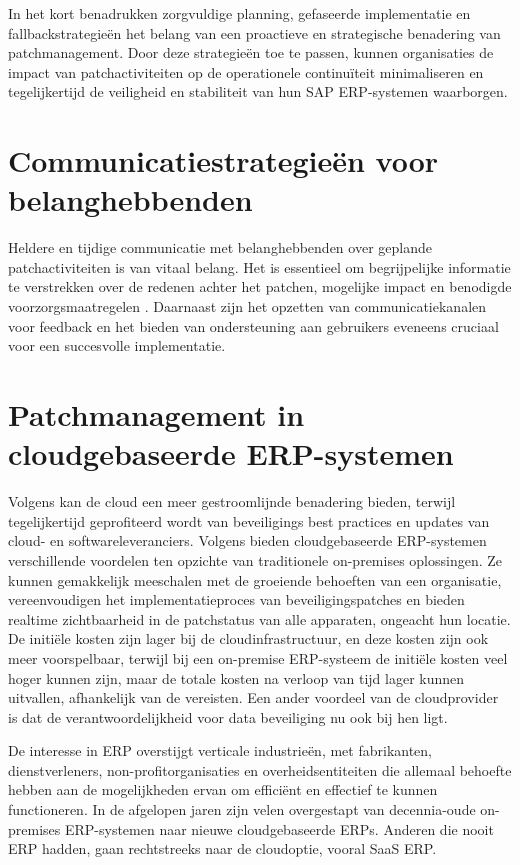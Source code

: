 In het kort benadrukken zorgvuldige planning, gefaseerde implementatie en fallbackstrategieën het belang van een proactieve en strategische benadering van patchmanagement. Door deze strategieën toe te passen, kunnen organisaties de impact van patchactiviteiten op de operationele continuïteit minimaliseren en tegelijkertijd de veiligheid en stabiliteit van hun SAP ERP-systemen waarborgen.

\section{Communicatiestrategieën voor belanghebbenden}
Heldere en tijdige communicatie met belanghebbenden over geplande patchactiviteiten is van vitaal belang. Het is essentieel om begrijpelijke informatie te verstrekken over de redenen achter het patchen, mogelijke impact en benodigde voorzorgsmaatregelen \autocite{Toren2019}. Daarnaast zijn het opzetten van communicatiekanalen voor feedback en het bieden van ondersteuning aan gebruikers eveneens cruciaal voor een succesvolle implementatie.

\section{Patchmanagement in cloudgebaseerde ERP-systemen}
Volgens \textcite{Forbes2021} kan de cloud een meer gestroomlijnde benadering bieden, terwijl tegelijkertijd geprofiteerd wordt van beveiligings best practices en updates van cloud- en softwareleveranciers. Volgens \textcite{Cox2020} bieden cloudgebaseerde ERP-systemen verschillende voordelen ten opzichte van traditionele on-premises oplossingen. Ze kunnen gemakkelijk meeschalen met de groeiende behoeften van een organisatie, vereenvoudigen het implementatieproces van beveiligingspatches en bieden realtime zichtbaarheid in de patchstatus van alle apparaten, ongeacht hun locatie. De initiële kosten zijn lager bij de cloudinfrastructuur, en deze kosten zijn ook meer voorspelbaar, terwijl bij een on-premise ERP-systeem de initiële kosten veel hoger kunnen zijn, maar de totale kosten na verloop van tijd lager kunnen uitvallen, afhankelijk van de vereisten. Een ander voordeel van de cloudprovider is dat de verantwoordelijkheid voor data beveiliging nu ook bij hen ligt.

De interesse in ERP overstijgt verticale industrieën, met fabrikanten, dienstverleners, non-profitorganisaties en overheidsentiteiten die allemaal behoefte hebben aan de mogelijkheden ervan om efficiënt en effectief te kunnen functioneren. In de afgelopen jaren zijn velen overgestapt van decennia-oude on-premises ERP-systemen naar nieuwe cloudgebaseerde ERPs. Anderen die nooit ERP hadden, gaan rechtstreeks naar de cloudoptie, vooral SaaS ERP.

